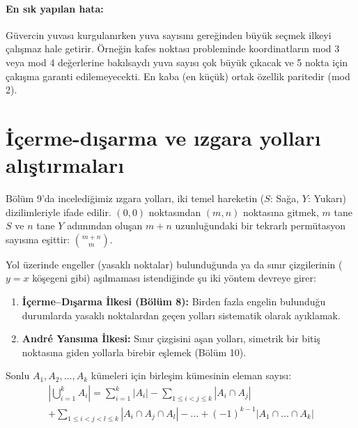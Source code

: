 \paragraph{En sık yapılan hata:}
Güvercin yuvası kurgulanırken yuva sayısını gereğinden büyük seçmek ilkeyi çalışmaz hale getirir. Örneğin kafes noktası probleminde koordinatların mod 3 veya mod 4 değerlerine bakılsaydı yuva sayısı çok büyük çıkacak ve 5 nokta için çakışma garanti edilemeyecekti. En kaba (en küçük) ortak özellik paritedir (mod 2).

\section{İçerme-dışarma ve ızgara yolları alıştırmaları}

Bölüm 9'da incelediğimiz ızgara yolları, iki temel hareketin ($S$: Sağa, $Y$: Yukarı) dizilimleriyle ifade edilir. $(0,0)$ noktasından $(m,n)$ noktasına gitmek, $m$ tane $S$ ve $n$ tane $Y$ adımından oluşan $m+n$ uzunluğundaki bir tekrarlı permütasyon sayısına eşittir: $\binom{m+n}{m}$.

Yol üzerinde engeller (yasaklı noktalar) bulunduğunda ya da sınır çizgilerinin ($y = x$ köşegeni gibi) aşılmaması istendiğinde şu iki yöntem devreye girer:
\begin{enumerate}
    \item \textbf{İçerme--Dışarma İlkesi (Bölüm 8):} Birden fazla engelin bulunduğu durumlarda yasaklı noktalardan geçen yolları sistematik olarak ayıklamak.
    \item \textbf{André Yansıma İlkesi:} Sınır çizgisini aşan yolları, simetrik bir bitiş noktasına giden yollarla birebir eşlemek (Bölüm 10).
\end{enumerate}

\begin{theorem}
Sonlu $A_1, A_2, \dots, A_k$ kümeleri için birleşim kümesinin eleman sayısı:
\begin{multline*}
\left| \bigcup_{i=1}^k A_i \right| = \sum_{i=1}^k |A_i| - \sum_{1 \le i < j \le k} |A_i \cap A_j| \\
+ \sum_{1 \le i < j < l \le k} |A_i \cap A_j \cap A_l| - \dots + (-1)^{k-1} |A_1 \cap \dots \cap A_k|
\end{multline*}
\end{theorem}

